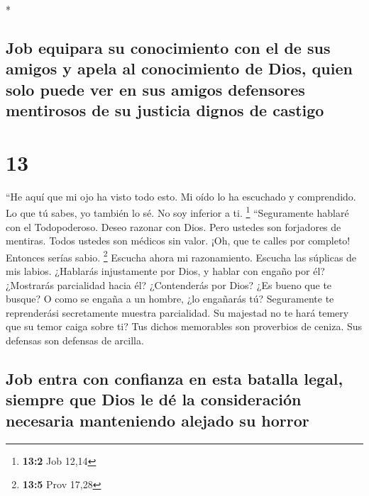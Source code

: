 \begin{paracol}{2}
\switchcolumn[0]*

\hypertarget{job-equipara-su-conocimiento-con-el-de-sus-amigos-y-apela-al-conocimiento-de-dios-quien-solo-puede-ver-en-sus-amigos-defensores-mentirosos-de-su-justicia-dignos-de-castigo}{%
\subsection{Job equipara su conocimiento con el de sus amigos y apela al
conocimiento de Dios, quien solo puede ver en sus amigos defensores
mentirosos de su justicia dignos de
castigo}\label{job-equipara-su-conocimiento-con-el-de-sus-amigos-y-apela-al-conocimiento-de-dios-quien-solo-puede-ver-en-sus-amigos-defensores-mentirosos-de-su-justicia-dignos-de-castigo}}

\hypertarget{section-24}{%
\section{13}\label{section-24}}

 ``He aquí que mi ojo ha visto todo esto. Mi oído lo ha
escuchado y comprendido.  Lo que tú sabes, yo también lo
sé. No soy inferior a ti. \footnote{\textbf{13:2} Job 12,14}
 ``Seguramente hablaré con el Todopoderoso. Deseo razonar
con Dios.  Pero ustedes son forjadores de mentiras. Todos
ustedes son médicos sin valor.  ¡Oh, que te calles por
completo! Entonces serías sabio. \footnote{\textbf{13:5} Prov 17,28}
 Escucha ahora mi razonamiento. Escucha las súplicas de
mis labios.  ¿Hablarás injustamente por Dios, y hablar con
engaño por él?  ¿Mostrarás parcialidad hacia él?
¿Contenderás por Dios?  ¿Es bueno que te busque? O como se
engaña a un hombre, ¿lo engañarás tú?  Seguramente te
reprenderási secretamente muestra parcialidad.  Su
majestad no te hará temery que su temor caiga sobre ti? 
Tus dichos memorables son proverbios de ceniza. Sus defensas son
defensas de arcilla.

\hypertarget{job-entra-con-confianza-en-esta-batalla-legal-siempre-que-dios-le-duxe9-la-consideraciuxf3n-necesaria-manteniendo-alejado-su-horror}{%
\subsection{Job entra con confianza en esta batalla legal, siempre que
Dios le dé la consideración necesaria manteniendo alejado su
horror}\label{job-entra-con-confianza-en-esta-batalla-legal-siempre-que-dios-le-duxe9-la-consideraciuxf3n-necesaria-manteniendo-alejado-su-horror}}


\end{paracol}

